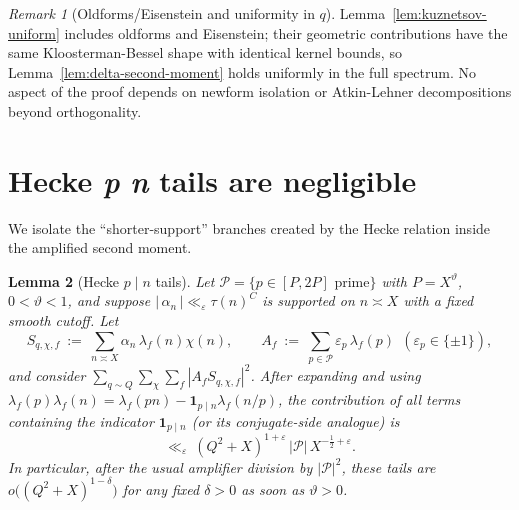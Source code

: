 \documentclass[11pt]{article}
\newtheorem{lemma}{Lemma}[part]
\theoremstyle{definition}
\theoremstyle{remark}
\newtheorem{remark}[lemma]{Remark}
\numberwithin{equation}{part}
\begin{document}
\begin{remark}[Oldforms/Eisenstein and uniformity in $q$]
	Lemma~\ref{lem:kuznetsov-uniform} includes oldforms and Eisenstein; their geometric contributions have the same Kloosterman-Bessel shape with identical kernel bounds, so Lemma~\ref{lem:delta-second-moment} holds uniformly in the full spectrum. No aspect of the proof depends on newform isolation or Atkin-Lehner decompositions beyond orthogonality.
\end{remark}

\section{Hecke \textit p \textbar  \textit n tails are negligible}\label{sec:hecke-tails}

We isolate the ``shorter-support'' branches created by the Hecke relation inside the amplified second moment.

\begin{lemma}[Hecke $p\mid n$ tails]\label{lem:hecke-tails}
	Let $\mathcal P=\{p\in[P,2P]\text{ prime}\}$ with $P=X^\vartheta$, $0<\vartheta<1$,
	and suppose $|\,\alpha_n\,|\ll_\varepsilon \tau(n)^C$ is supported on $n\asymp X$ with a fixed smooth cutoff.
	Let
	\[
		S_{q,\chi,f}\ :=\ \sum_{n\asymp X}\alpha_n\,\lambda_f(n)\chi(n),
		\qquad
		A_f\ :=\ \sum_{p\in\mathcal P}\varepsilon_p\,\lambda_f(p)\ \ (\varepsilon_p\in\{\pm1\}),
	\]
	and consider $\sum_{q\sim Q}\sum_{\chi}\sum_f |A_f S_{q,\chi,f}|^2$.
	After expanding and using $\lambda_f(p)\lambda_f(n)=\lambda_f(pn)-\mathbf1_{p\mid n}\lambda_f(n/p)$,
	the contribution of all terms containing the indicator $\mathbf1_{p\mid n}$ (or its conjugate-side analogue) is
	\[
		\ll_\varepsilon\ (Q^2+X)^{1+\varepsilon}\,|\mathcal P|\,X^{-\tfrac12+\varepsilon}.
	\]
	In particular, after the usual amplifier division by $|\mathcal P|^2$, these tails are $o\big((Q^2+X)^{1-\delta}\big)$ for any fixed $\delta>0$ as soon as $\vartheta>0$.
\end{lemma}
\end{document}
